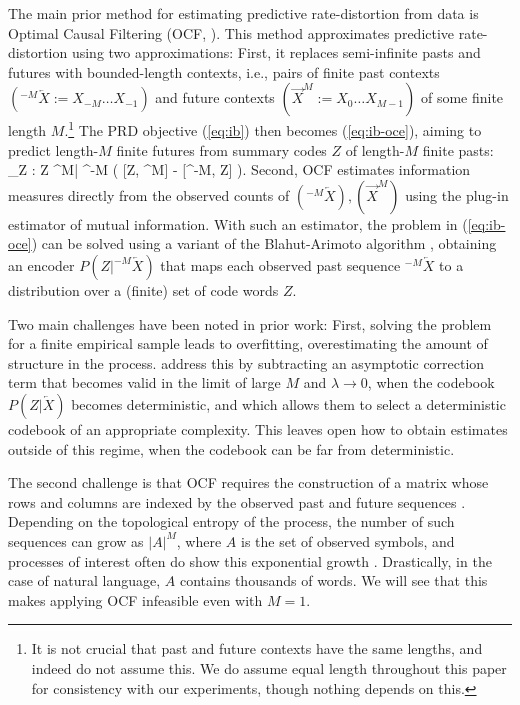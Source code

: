 \documentclass[entropy,article,submit,moreauthors,pdftex,10pt,a4paper]{Definitions/mdpi}
\newif \ifcomment
\newcommand\rljf[1]{\ifcomment{{\color{blue}(#1)}}\else{}\fi}
\newcommand{\past}{\overleftarrow{X}}
\newcommand{\finitefuture}{\overrightarrow{X}^{M}}
\newcommand{\finitepast}{^{-M}\overleftarrow{X}}%
\let\oldequation\equation
\let\oldendequation\endequation
\renewenvironment{equation}
  {\linenomathNonumbers\oldequation}
  {\oldendequation\endlinenomath}
\begin{document}
The main prior method for estimating predictive rate-distortion from data is Optimal Causal Filtering (OCF, \citet{still-optimal-2010}).
This method approximates predictive rate-distortion using two approximations:
First, it replaces semi-infinite pasts and futures with bounded-length contexts, i.e., pairs of finite past contexts $(\finitepast := X_{-M}\dots X_{-1})$ and future contexts $(\finitefuture := X_{0}\dots X_{M-1})$ of some finite length $M$.\footnote{It is not crucial that past and future contexts have the same lengths, and indeed \citet{still-optimal-2010} do not assume this. We do assume equal length throughout this paper for consistency with our experiments, though nothing depends on this.}
The PRD objective (\ref{eq:ib}) then becomes (\ref{eq:ib-oce}), aiming to predict length-$M$ finite futures from summary codes $Z$ of length-$M$ finite pasts:
\begin{equation}\label{eq:ib-oce}
	\max_{Z : Z \bot \finitefuture | \finitepast} \left( [Z, \finitefuture] - \lambda \cdot {}[\finitepast, Z] \right).
\end{equation}
Second, OCF estimates information measures directly from the observed counts of $(\finitepast), (\finitefuture)$ using the plug-in estimator of mutual information. %
With such an estimator, the problem in (\ref{eq:ib-oce}) can be solved using a variant of the Blahut-Arimoto algorithm \citep{tishby-information-1999}, obtaining an encoder $P(Z|\finitepast)$ that maps each observed past sequence $\finitepast$ to a distribution over a (finite) set of code words $Z$.

Two main challenges have been noted in prior work:
First, solving the problem for a finite empirical sample leads to overfitting, overestimating the amount of structure in the process.
\citet{still-optimal-2010} address this by subtracting an asymptotic correction term that becomes valid in the limit of large $M$ and $\lambda \rightarrow 0$, when the codebook $P(Z|\past)$ becomes deterministic, and which allows them to select a deterministic codebook of an appropriate complexity.
This leaves open how to obtain estimates outside of this regime, when the codebook can be far from deterministic.

The second challenge is that OCF requires the construction of a matrix whose rows and columns are indexed by the observed past and future sequences \citep{marzen-predictive-2016}.
Depending on the topological entropy of the process, the number of such sequences can grow as $|A|^M$, where $A$ is the set of observed symbols, and processes of interest often do show this exponential growth \citep{marzen-predictive-2016}.
Drastically, in the case of natural language, $A$ contains thousands of words.
We will see that this makes applying OCF infeasible even with $M=1$.
\end{document}
